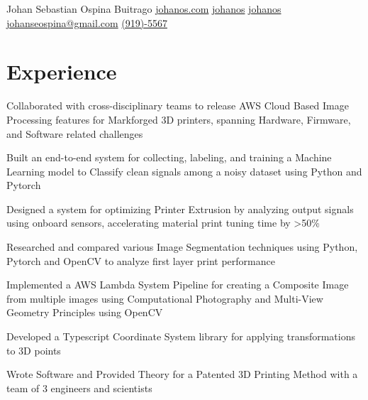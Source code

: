 \documentclass[]{plushcv}
\begin{document}
%
%
    
\namesection
{Johan Sebastian }
{Ospina Buitrago}
{}
{
    \contactline
    {\href{https://www.johanos.com}{johanos.com}}
    {\href{https://www.github.com/johanos}{johanos}}
    {\href{https://www.linkedin.com/in/johanos}
        {johanos}}
    {\href{mailto:johanseospina@gmail.com}{johanseospina@gmail.com}}
    {\href{tel:+1 (919) 946-5567}{(919)-5567}}
}

%
%

\begin{minipage}[t]{0.70\textwidth}



    \section{Experience}
    \vspace{\topsep} %
    \begin{tightemize}
        \sectionsep
        \item Collaborated with cross-disciplinary teams to release AWS Cloud Based Image Processing features for Markforged 3D printers, spanning Hardware, Firmware, and Software related challenges
        \item Built an end-to-end system for collecting, labeling, and training a Machine Learning model to Classify clean signals among a noisy dataset using Python and Pytorch
        \item Designed a system for optimizing Printer Extrusion by analyzing output signals using onboard sensors, accelerating material print tuning time by >50\%
        \item Researched and compared various Image Segmentation techniques using Python, Pytorch and OpenCV to analyze first layer print performance
        \item Implemented a AWS Lambda System Pipeline for creating a Composite Image from multiple images using Computational Photography and Multi-View Geometry Principles using OpenCV
        \item Developed a Typescript Coordinate System library for applying transformations to 3D points
        \item Wrote Software and Provided Theory for a Patented 3D Printing Method with a team of 3 engineers and scientists
    \end{tightemize}
    \sectionsep


\end{minipage}
\end{document}

